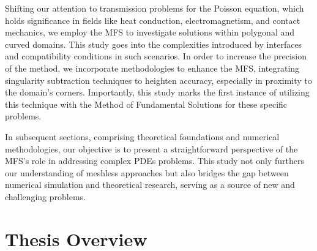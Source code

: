 Shifting our attention to transmission problems for the Poisson equation, which holds significance in fields like heat conduction, electromagnetism, and contact mechanics, we employ the \ac{MFS} to investigate solutions within polygonal and curved domains. This study goes into the complexities introduced by interfaces and compatibility conditions in such scenarios. In order to increase the precision of the method, we incorporate methodologies to enhance the \ac{MFS}, integrating singularity subtraction techniques to heighten accuracy, especially in proximity to the domain's corners. Importantly, this study marks the first instance of utilizing this technique with the Method of Fundamental Solutions for these specific problems.

In subsequent sections, comprising theoretical foundations and numerical methodologies, our objective is to present a straightforward perspective of the \ac{MFS}'s role in addressing complex \acp{PDE} problems. This study not only furthers our understanding of meshless approaches but also bridges the gap between numerical simulation and theoretical research, serving as a source of new and challenging problems.






\section{Thesis Overview}

